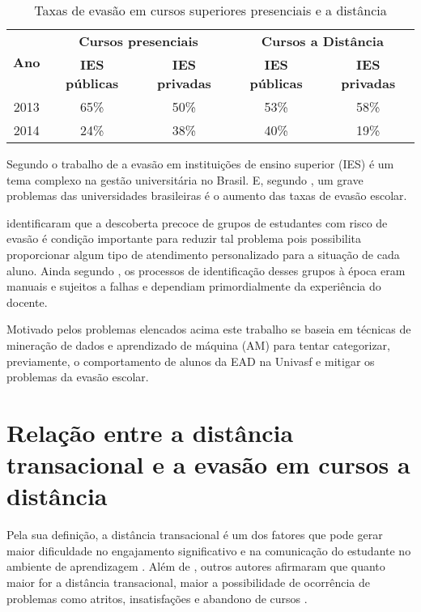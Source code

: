 \begin{table}[!htb]
  \centering
  \caption{\label{tableEvasionTax2} Taxas de evasão em cursos superiores presenciais e a distância}
  \begin{tabular}{@{}ccccc@{}}
    \toprule
    \multirow{2}{*}{\textbf{Ano}} & \multicolumn{2}{c}{\textbf{Cursos presenciais}} & \multicolumn{2}{c}{\textbf{Cursos a Distância}} \\ \cmidrule(l){2-5}
    & \textbf{IES públicas} & \textbf{IES privadas} & \textbf{IES públicas} & \textbf{IES privadas} \\ \midrule
    2013 & 65\% & 50\% & 53\% & 58\% \\
    2014 & 24\% & 38\% & 40\% & 19\% \\ \bottomrule
  \end{tabular}
\end{table}

Segundo o trabalho de  a
evasão em instituições de ensino superior (IES) é um tema complexo na gestão
universitária no Brasil. E, segundo
, um grave problemas das
universidades brasileiras é o aumento das taxas de evasão escolar.

 identificaram que a descoberta precoce de
grupos de estudantes com risco de evasão é condição importante para reduzir tal
problema pois possibilita proporcionar algum tipo de atendimento personalizado
para a situação de cada aluno. Ainda segundo ,
os processos de identificação desses grupos à época eram manuais e sujeitos a
falhas e dependiam primordialmente da experiência do docente.

Motivado pelos problemas elencados acima este trabalho se baseia em técnicas de
mineração de dados e aprendizado de máquina (AM) para tentar categorizar,
previamente, o comportamento de alunos da EAD na Univasf e mitigar os problemas
da evasão escolar.

\section{Relação entre a distância transacional e a evasão em cursos a distância}

Pela sua definição, a distância transacional é um dos fatores que pode gerar
maior dificuldade no engajamento significativo e na comunicação do estudante no
ambiente de aprendizagem \cite{goel2012transactional}. Além de
, outros autores afirmaram que quanto maior for a
distância transacional, maior a possibilidade de ocorrência de problemas como
atritos, insatisfações e abandono de cursos
\cite{zhang2003transactional,steinman2007educational,horzum2011developing,
mbwesa2014transactional,paul2015revisiting}.

